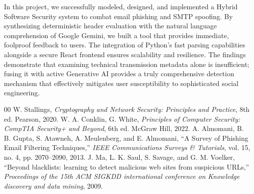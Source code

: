 \documentclass[conference]{IEEEtran}
\begin{document}
In this project, we successfully modeled, designed, and implemented a Hybrid Software Security system to combat email phishing and SMTP spoofing. By synthesizing deterministic header evaluation with the natural language comprehension of Google Gemini, we built a tool that provides immediate, foolproof feedback to users. The integration of Python's fast parsing capabilities alongside a secure React frontend ensures scalability and resilience. The findings demonstrate that examining technical transmission metadata alone is insufficient; fusing it with active Generative AI provides a truly comprehensive detection mechanism that effectively mitigates user susceptibility to sophisticated social engineering. 

\begin{thebibliography}{00}
 W. Stallings, \textit{Cryptography and Network Security: Principles and Practice}, 8th ed. Pearson, 2020.
 W. A. Conklin, G. White, \textit{Principles of Computer Security: CompTIA Security+ and Beyond}, 6th ed. McGraw Hill, 2022.
 A. Almomani, B. B. Gupta, S. Atawneh, A. Meulenberg, and E. Almomani, ``A Survey of Phishing Email Filtering Techniques,'' \textit{IEEE Communications Surveys \& Tutorials}, vol. 15, no. 4, pp. 2070--2090, 2013.
 J. Ma, L. K. Saul, S. Savage, and G. M. Voelker, ``Beyond blacklists: learning to detect malicious web sites from suspicious URLs,'' \textit{Proceedings of the 15th ACM SIGKDD international conference on Knowledge discovery and data mining}, 2009.
\end{thebibliography}
\end{document}
